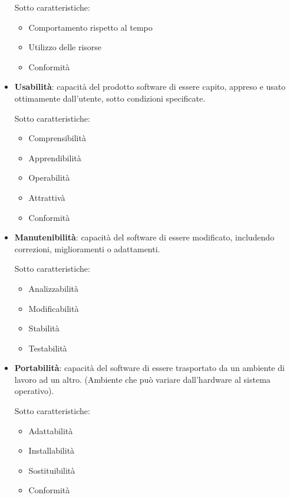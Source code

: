 \begin{itemize}
			Sotto caratteristiche:
			
			\begin{itemize}
			
				\item Comportamento rispetto al tempo
				\item Utilizzo delle risorse
				\item Conformità
				
			\end{itemize}

		\item \textbf{Usabilità}: capacità del prodotto software di essere capito, appreso e usato ottimamente dall'utente, sotto condizioni specificate.
		
			Sotto caratteristiche:
			
			\begin{itemize}
			
				\item Comprensibilità
				\item Apprendibilità
				\item Operabilità
				\item Attrattivà
				\item Conformità

			\end{itemize}

		\item \textbf{Manutenibilità}: capacità del software di essere modificato, includendo correzioni, miglioramenti o adattamenti.
		
			Sotto caratteristiche:
		
			\begin{itemize}
			
				\item Analizzabilità
				\item Modificabilità
				\item Stabilità
				\item Testabilità
				
			\end{itemize}

		\item \textbf{Portabilità}: capacità del software di essere trasportato da un ambiente di lavoro ad un altro. (Ambiente che può variare dall'hardware al sistema operativo).
		
			Sotto caratteristiche:
			
			\begin{itemize}
			
				\item Adattabilità
				\item Installabilità
				\item Sostituibilità
				\item Conformità
				
			\end{itemize}
			
		\end{itemize}
		
